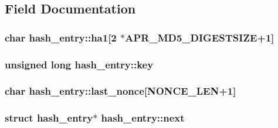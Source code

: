 \subsection{Field Documentation}
\subsubsection[{\texorpdfstring{ha1}{ha1}}]{\setlength{\rightskip}{0pt plus 5cm}char hash\+\_\+entry\+::ha1\mbox{[}2 $\ast${\bf A\+P\+R\+\_\+\+M\+D5\+\_\+\+D\+I\+G\+E\+S\+T\+S\+I\+ZE}+1\mbox{]}}\hypertarget{structhash__entry_a5b56e4a2878d2a0e4dac4746c3f39f14}{}\label{structhash__entry_a5b56e4a2878d2a0e4dac4746c3f39f14}
\subsubsection[{\texorpdfstring{key}{key}}]{\setlength{\rightskip}{0pt plus 5cm}unsigned long hash\+\_\+entry\+::key}\hypertarget{structhash__entry_a6389e425e2e67ec704fdd863773aad65}{}\label{structhash__entry_a6389e425e2e67ec704fdd863773aad65}
\subsubsection[{\texorpdfstring{last\+\_\+nonce}{last_nonce}}]{\setlength{\rightskip}{0pt plus 5cm}char hash\+\_\+entry\+::last\+\_\+nonce\mbox{[}{\bf N\+O\+N\+C\+E\+\_\+\+L\+EN}+1\mbox{]}}\hypertarget{structhash__entry_a6b4c8e58934a456ba0849c7f52ea4b85}{}\label{structhash__entry_a6b4c8e58934a456ba0849c7f52ea4b85}
\subsubsection[{\texorpdfstring{next}{next}}]{\setlength{\rightskip}{0pt plus 5cm}struct {\bf hash\+\_\+entry}$\ast$ hash\+\_\+entry\+::next}\hypertarget{structhash__entry_a89d54620c14cf507f4a87d0b12721db7}{}\label{structhash__entry_a89d54620c14cf507f4a87d0b12721db7}
